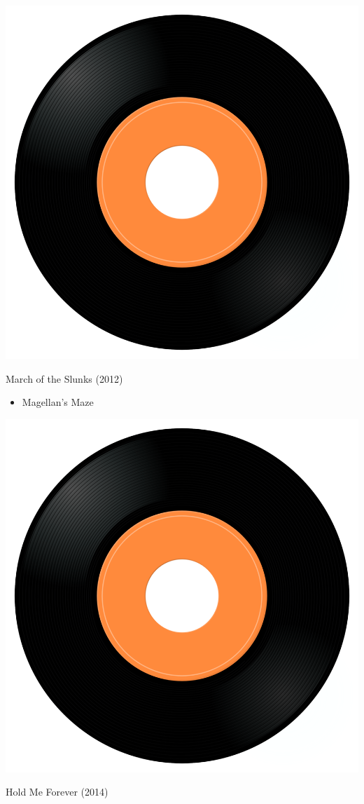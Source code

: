 \begin{minipage}[t]{0.25\textwidth}
\captionsetup{type=figure}
\includegraphics[width=\textwidth]{Images/cover.png}
\caption*{March of the Slunks (2012)}
\end{minipage}
\begin{minipage}[t]{0.25\textwidth}\vspace{0pt}
\begin{itemize}[nosep,leftmargin=1em,labelwidth=*,align=left]
	\setlength{\itemsep}{0pt}
	\item Magellan's Maze
\end{itemize}
\end{minipage}
\begin{minipage}[t]{0.25\textwidth}
\captionsetup{type=figure}
\includegraphics[width=\textwidth]{Images/cover.png}
\caption*{Hold Me Forever (2014)}
\end{minipage}
